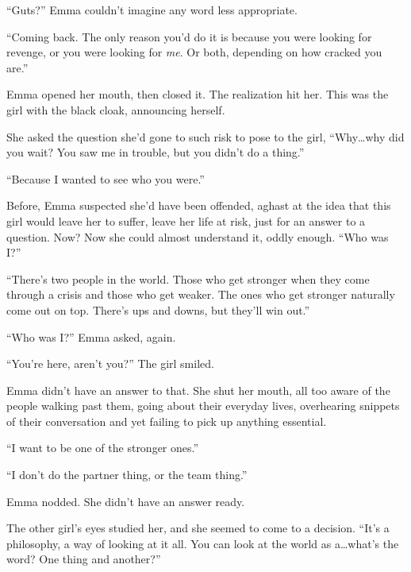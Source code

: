 ``Guts?''  Emma couldn't imagine any word less appropriate.



``Coming back.  The only reason you'd do it is because you were looking for revenge, or you were looking for \emph{me}.  Or both, depending on how cracked you are.''



Emma opened her mouth, then closed it.  The realization hit her.  This was the girl with the black cloak, announcing herself.



She asked the question she'd gone to such risk to pose to the girl, ``Why\ldots why did you wait?  You saw me in trouble, but you didn't do a thing.''



``Because I wanted to see who you were.''



Before, Emma suspected she'd have been offended, aghast at the idea that this girl would leave her to suffer, leave her life at risk, just for an answer to a question.  Now?  Now she could almost understand it, oddly enough.  ``Who was I?''



``There's two people in the world.  Those who get stronger when they come through a crisis and those who get weaker.  The ones who get stronger naturally come out on top.  There's ups and downs, but they'll win out.''



``Who was I?'' Emma asked, again.



``You're here, aren't you?''  The girl smiled.



Emma didn't have an answer to that.  She shut her mouth, all too aware of the people walking past them, going about their everyday lives, overhearing snippets of their conversation and yet failing to pick up anything essential.



``I want to be one of the stronger ones.''



``I don't do the partner thing, or the team thing.''



Emma nodded.  She didn't have an answer ready.



The other girl's eyes studied her, and she seemed to come to a decision.  ``It's a philosophy, a way of looking at it all. You can look at the world as a\ldots what's the word?  One thing and another?''



